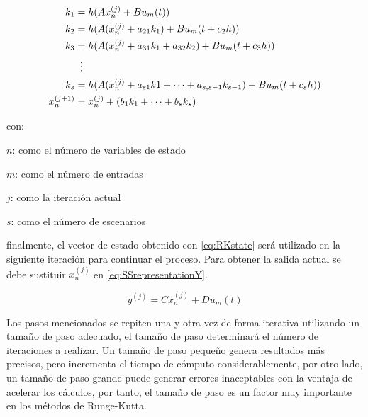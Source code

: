             \begin{equation}\label{eq:RKstate}
                \begin{aligned}
                    k_1 &= h(Ax_n^{(j)} + Bu_m(t))\\
                    k_2 &= h(A(x_n^{(j)} +  a_{21}k_1) + Bu_m(t + c_2 h))\\
                    k_3 &= h(A(x_n^{(j)} +  a_{31}k_1 + a_{32}k_2) + Bu_m(t  + c_3 h))\\
                    &\mathrel{\makebox[\widthof{=}]{\vdots}}\\
                    k_s &= h(A(x_n^{(j)} + a_{s1}k1 + \cdots +  a_{s,s-1}k_{s-1}) + Bu_m(t  + c_s h))\\
                    x_n^{(j+1)} &= x_n^{(j)} + (b_1 k_1 + \cdots + b_s k_s)
                \end{aligned}
            \end{equation}
            
            \noindent con:

            \begin{spacing}{1.5}
				
				$n$: como el número de variables de estado
				
				$m$: como el número de entradas
				
				$j$: como la iteración actual
                
                $s$: como el número de escenarios
            \end{spacing}

            \noindent finalmente, el vector de estado obtenido con \cref{eq:RKstate} será utilizado en la siguiente iteración para continuar el proceso. Para obtener la salida actual se debe sustituir $x_n^{(j)}$  en \cref{eq:SSrepresentationY}. 
            
            \begin{equation}
				y^{(j)} = Cx_n^{(j)} + Du_m(t) \label{eq:rkrepresentationY}
            \end{equation}
            
            Los pasos mencionados se repiten una y otra vez de forma iterativa utilizando un tamaño de paso adecuado, el tamaño de paso determinará el número de iteraciones a realizar. Un tamaño de paso pequeño genera resultados más precisos, pero incrementa el tiempo de cómputo considerablemente, por otro lado, un tamaño de paso grande puede generar errores inaceptables con la ventaja de acelerar los cálculos, por tanto, el tamaño de paso es un factor muy importante en los métodos de Runge-Kutta.

